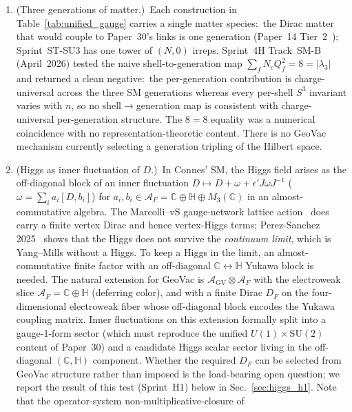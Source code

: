 \documentclass[11pt]{article}
\begin{document}
\begin{enumerate}\setlength{\itemsep}{2pt}
\item[\textbf{G1}] (Three generations of matter.)\ Each
construction in Table~\ref{tab:unified_gauge} carries a single
matter species:\ the Dirac matter that would couple to Paper~30's
links is one generation (Paper~14 Tier~2~\cite{paper14}); Sprint~ST-SU3 has one tower of
$(N, 0)$ irreps.  Sprint~4H Track~SM-B (April~2026) tested the naive
shell-to-generation map $\sum_f N_c Q_f^2 = 8 = |\lambda_3|$ and
returned a clean negative:\ the per-generation contribution is
charge-universal across the three SM generations whereas every
per-shell $S^3$ invariant varies with $n$, so no shell$\to$generation
map is consistent with charge-universal per-generation structure.
The $8 = 8$ equality was a numerical coincidence with no
representation-theoretic content.  There is no GeoVac mechanism
currently selecting a generation tripling of the Hilbert space.
\item[\textbf{G2}] (Higgs as inner fluctuation of $D$.)\ In
Connes' SM, the Higgs field arises as the off-diagonal block of an
inner fluctuation $D \mapsto D + \omega + \epsilon' J \omega
J^{-1}$ ($\omega = \sum_i a_i [D, b_i]$) for $a_i, b_i \in
\mathcal{A}_F = \mathbb{C} \oplus \mathbb{H} \oplus M_3(\mathbb{C})$
in an almost-commutative algebra.  The Marcolli--vS gauge-network
lattice action~\cite{marcolli_vs2014} does carry a finite vertex Dirac
and hence vertex-Higgs terms; Perez-Sanchez 2025~\cite{perez_sanchez2025}
shows that the Higgs does not survive the \emph{continuum limit},
which is Yang--Mills without a Higgs.  To keep a Higgs in the limit,
an almost-commutative finite factor with an off-diagonal
$\mathbb{C} \leftrightarrow \mathbb{H}$ Yukawa block is needed.  The natural extension
for GeoVac is $\mathcal{A}_{\mathrm{GV}} \otimes \mathcal{A}_F$
with the electroweak slice $\mathcal{A}_F = \mathbb{C} \oplus
\mathbb{H}$ (deferring color), and with a finite Dirac
$D_F$ on the four-dimensional electroweak fiber whose off-diagonal
block encodes the Yukawa coupling matrix.  Inner fluctuations on
this extension formally split into a gauge-1-form sector (which
must reproduce the unified $U(1) \times \mathrm{SU}(2)$ content of
Paper~30) and a candidate Higgs scalar sector living in the
off-diagonal $(\mathbb{C}, \mathbb{H})$ component.  Whether the
required $D_F$ can be selected from GeoVac structure rather than
imposed is the load-bearing open question; we report the result of
this test (Sprint~H1) below in Sec.~\ref{sec:higgs_h1}.  Note that
the operator-system non-multiplicative-closure of

\end{enumerate}
\end{document}
